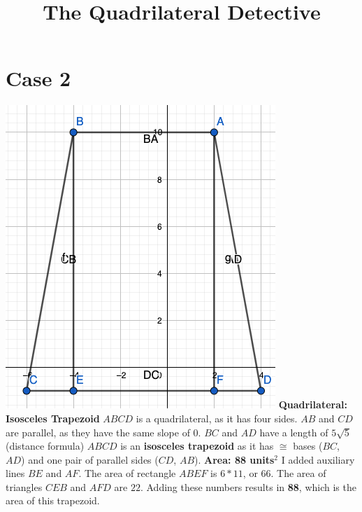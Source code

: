 \documentclass{article}
\begin{document}
	
	\setlength{\droptitle}{-5em}
	\title{The Quadrilateral Detective}
	\date{}
	\author{}
	\maketitle
	
	\section*{Case 2}
	\includegraphics[scale=0.3]{pics/Case2} \newline
	\textbf{Quadrilateral: Isosceles Trapezoid} \newline
	$ABCD$ is a quadrilateral, as it has four sides.\newline
	$AB$ and $CD$ are parallel, as they have the same slope of 0. \newline
	$BC$ and $AD$ have a length of $5\sqrt{5}$ (distance formula) \newline
	$ABCD$ is an \textbf{isosceles trapezoid} as it has $\cong$ bases ($BC$, $AD$) and one pair of parallel sides ($CD$, $AB$). \newline \newline
	\textbf{Area: 88 units$^2$} \newline
	I added auxiliary lines $BE$ and $AF$. \newline
	The area of rectangle $ABEF$ is $6 * 11$, or $66$. \newline
	The area of triangles $CEB$ and $AFD$ are $22$. \newline
	Adding these numbers results in \textbf{88}, which is the area of this trapezoid. 
\end{document}
